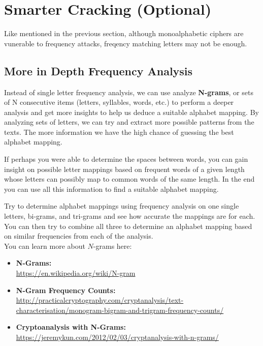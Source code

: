 \documentclass{article}
\begin{document}
\section{Smarter Cracking (Optional)}
Like mentioned in the previous section, although monoalphabetic ciphers are vunerable to frequency attacks, freqency matching letters may not be enough.

\subsection{More in Depth Frequency Analysis}
Instead of single letter frequency analysis, we can use analyze \textbf{N-grams}, or sets of N consecutive items (letters, syllables, words, etc.) to perform a deeper analysis and get more insights to help us deduce a suitable alphabet mapping. By analyzing sets of letters, we can try and extract more possible patterns from the texts. The more information we have the high chance of guessing the best alphabet mapping.

If perhaps you were able to determine the spaces between words, you can gain insight on possible letter mappings based on frequent words of a given length whose letters can possibly map to common words of the same length. In the end you can use all this information to find a suitable alphabet mapping.

Try to determine alphabet mappings using frequency analysis on one single letters, bi-grams, and tri-grams and see how accurate the mappings are for each. You can then try to combine all three to determine an alphabet mapping based on similar frequencies from each of the analysis.\\

\noindent You can learn more about $N$-grams here:
\begin{itemize}
\item \textbf{N-Grams:}\\ \url{https://en.wikipedia.org/wiki/N-gram}
\item \textbf{N-Gram Frequency Counts:}\\ \url{http://practicalcryptography.com/cryptanalysis/text-characterisation/monogram-bigram-and-trigram-frequency-counts/}
\item \textbf{Cryptoanalysis with N-Grams:}\\ \url{https://jeremykun.com/2012/02/03/cryptanalysis-with-n-grams/}
\end{itemize}
\end{document}
